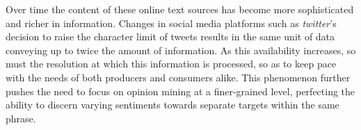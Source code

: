 \documentclass[../../fyp.tex]{subfiles}
\begin{document}
Over time the content of these online text sources has become more sophisticated and richer in information. Changes in social media platforms such as \textit{twitter}'s decision to raise the character limit of tweets results in the same unit of data conveying up to twice the amount of information. As this availability increases, so must the resolution at which this information is processed, so as to keep pace with the needs of both producers and consumers alike. This phenomenon further pushes the need to focus on opinion mining at a finer-grained level, perfecting the ability to discern varying sentiments towards separate targets within the same phrase.
\end{document}
